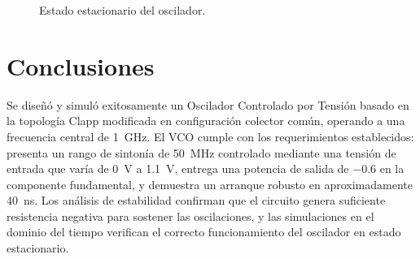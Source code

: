 \begin{figure}[htbp]
\centering
{}
\caption{Estado estacionario del oscilador.}
\label{fig:vco_steady_state}
\end{figure}

\section{Conclusiones}

Se diseñó y simuló exitosamente un Oscilador Controlado por Tensión basado en la topología Clapp modificada en configuración colector común, operando a una frecuencia central de \qty{1}{\GHz}. El VCO cumple con los requerimientos establecidos: presenta un rango de sintonía de \qty{50}{\MHz} controlado mediante una tensión de entrada que varía de \qty{0}{\V} a \qty{1,1}{\V}, entrega una potencia de salida de \qty{-0,6}{\dBm} en la componente fundamental, y demuestra un arranque robusto en aproximadamente \qty{40}{\ns}. Los análisis de estabilidad confirman que el circuito genera suficiente resistencia negativa para sostener las oscilaciones, y las simulaciones en el dominio del tiempo verifican el correcto funcionamiento del oscilador en estado estacionario.
